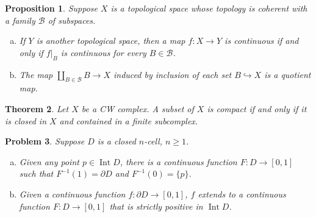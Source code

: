 \documentclass{article}
\newtheorem{theorem}{Theorem}
\newtheorem{problem}[theorem]{Problem}
\newtheorem{proposition}[theorem]{Proposition}
\theoremstyle{definition}
\begin{document}
\renewcommand{\thetheorem}{5.2}
\begin{proposition}
Suppose $X$ is a topological space whose topology is coherent with a family
$\mathcal{B}$ of subspaces.
\begin{enumerate}[(a)]
\item If $Y$ is another topological space, then a map $f : X \to Y$ is continuous 
if and only if $f|_B$ is continuous for every $B \in \mathcal{B}$.
\item The map $\coprod_{B \in \mathcal{B}} B \to X$ induced by inclusion of each 
set $B \hookrightarrow X$ is a quotient map.
\end{enumerate}
\end{proposition}

\renewcommand{\thetheorem}{5.14}
\begin{theorem}
Let $X$ be a CW complex. A subset of $X$ is compact if and only if it is
closed in $X$ and contained in a finite subcomplex.
\end{theorem}

\renewcommand{\thetheorem}{5-2}
\begin{problem}
Suppose $D$ is a closed $n$-cell, $n \ge 1$.
\begin{enumerate}[(a)]
\item Given any point $p \in \operatorname{Int} D$, there is a continuous function
$F : D \to [0,1]$ such that $F^{-1}(1) = \partial D$ and $F^{-1}(0)=\{p\}$.
\item Given a continuous function $f : \partial D \to [0,1]$, $f$ extends to a
continuous function $F : D \to [0,1]$ that is strictly positive in 
$\operatorname{Int} D$.
\end{enumerate}
\end{problem}
\end{document}
